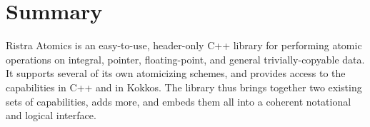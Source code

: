 
\section{Summary}
Ristra Atomics is an easy-to-use, header-only C++ library for performing atomic
operations on integral, pointer, floating-point, and general trivially-copyable
data. It supports several of its own atomicizing schemes, and provides access
to the capabilities in C++ and in Kokkos. The library thus brings together two
existing sets of capabilities, adds more, and embeds them all into a coherent
notational and logical interface.

\bye
